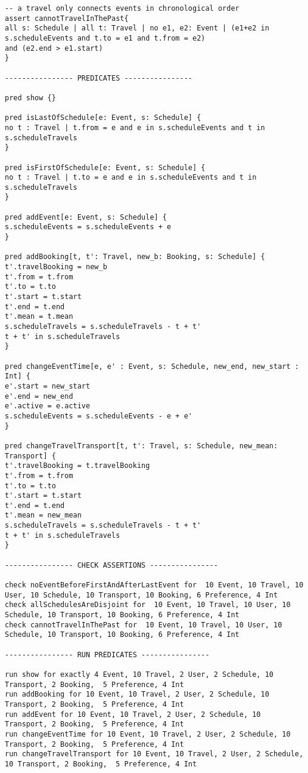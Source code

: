 \begin{lstlisting}[language=alloy]
-- a travel only connects events in chronological order
assert cannotTravelInThePast{
all s: Schedule | all t: Travel | no e1, e2: Event | (e1+e2 in s.scheduleEvents and t.to = e1 and t.from = e2)
and (e2.end > e1.start)
}

---------------- PREDICATES ----------------

pred show {}

pred isLastOfSchedule[e: Event, s: Schedule] {
no t : Travel | t.from = e and e in s.scheduleEvents and t in s.scheduleTravels
}

pred isFirstOfSchedule[e: Event, s: Schedule] {
no t : Travel | t.to = e and e in s.scheduleEvents and t in s.scheduleTravels
}

pred addEvent[e: Event, s: Schedule] {
s.scheduleEvents = s.scheduleEvents + e
}

pred addBooking[t, t': Travel, new_b: Booking, s: Schedule] {
t'.travelBooking = new_b
t'.from = t.from
t'.to = t.to
t'.start = t.start
t'.end = t.end
t'.mean = t.mean
s.scheduleTravels = s.scheduleTravels - t + t'
t + t' in s.scheduleTravels
}

pred changeEventTime[e, e' : Event, s: Schedule, new_end, new_start : Int] {
e'.start = new_start
e'.end = new_end
e'.active = e.active
s.scheduleEvents = s.scheduleEvents - e + e'
}

pred changeTravelTransport[t, t': Travel, s: Schedule, new_mean: Transport] {
t'.travelBooking = t.travelBooking
t'.from = t.from
t'.to = t.to
t'.start = t.start
t'.end = t.end
t'.mean = new_mean
s.scheduleTravels = s.scheduleTravels - t + t'
t + t' in s.scheduleTravels
}

---------------- CHECK ASSERTIONS ----------------

check noEventBeforeFirstAndAfterLastEvent for  10 Event, 10 Travel, 10 User, 10 Schedule, 10 Transport, 10 Booking, 6 Preference, 4 Int
check allSchedulesAreDisjoint for  10 Event, 10 Travel, 10 User, 10 Schedule, 10 Transport, 10 Booking, 6 Preference, 4 Int
check cannotTravelInThePast for  10 Event, 10 Travel, 10 User, 10 Schedule, 10 Transport, 10 Booking, 6 Preference, 4 Int

---------------- RUN PREDICATES ----------------

run show for exactly 4 Event, 10 Travel, 2 User, 2 Schedule, 10 Transport, 2 Booking,  5 Preference, 4 Int
run addBooking for 10 Event, 10 Travel, 2 User, 2 Schedule, 10 Transport, 2 Booking,  5 Preference, 4 Int
run addEvent for 10 Event, 10 Travel, 2 User, 2 Schedule, 10 Transport, 2 Booking,  5 Preference, 4 Int
run changeEventTime for 10 Event, 10 Travel, 2 User, 2 Schedule, 10 Transport, 2 Booking,  5 Preference, 4 Int
run changeTravelTransport for 10 Event, 10 Travel, 2 User, 2 Schedule, 10 Transport, 2 Booking,  5 Preference, 4 Int

\end{lstlisting}

